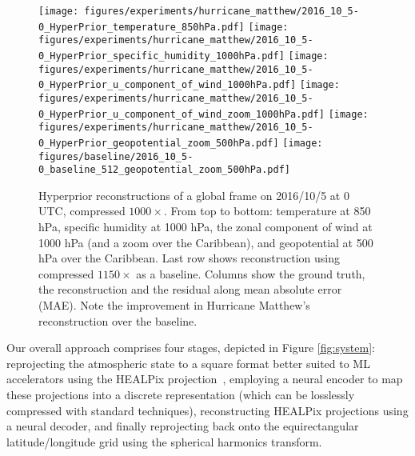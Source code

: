 \documentclass[11pt, a4paper, logo, copyright, numbering]{googledeepmind}
\begin{document}
\begin{figure}
\begin{flushright}
    \texttt{[image: figures/experiments/hurricane\_matthew/2016\_10\_5-0\_HyperPrior\_temperature\_850hPa.pdf]}
    \texttt{[image: figures/experiments/hurricane\_matthew/2016\_10\_5-0\_HyperPrior\_specific\_humidity\_1000hPa.pdf]}
    \texttt{[image: figures/experiments/hurricane\_matthew/2016\_10\_5-0\_HyperPrior\_u\_component\_of\_wind\_1000hPa.pdf]}
    \texttt{[image: figures/experiments/hurricane\_matthew/2016\_10\_5-0\_HyperPrior\_u\_component\_of\_wind\_zoom\_1000hPa.pdf]}
\texttt{[image: figures/experiments/hurricane\_matthew/2016\_10\_5-0\_HyperPrior\_geopotential\_zoom\_500hPa.pdf]}
    \texttt{[image: figures/baseline/2016\_10\_5-0\_baseline\_512\_geopotential\_zoom\_500hPa.pdf]}
\caption{Hyperprior reconstructions of a global frame on 2016/10/5 at 0 UTC, compressed $1000\times$. From top to bottom: temperature at 850 hPa, specific humidity at 1000 hPa, the zonal component of wind at 1000 hPa (and a zoom over the Caribbean), and geopotential at 500 hPa over the Caribbean. Last row shows reconstruction using \citet{huang2022compressing} compressed $1150\times$ as a baseline. Columns show the ground truth, the reconstruction and the residual along mean absolute error (MAE). Note the improvement in Hurricane Matthew's reconstruction over the baseline.}
    \label{fig:hurricane_matthew_hyperprior}
    \end{flushright}
\end{figure} 
Our overall approach comprises four stages, depicted in Figure \ref{fig:system}: reprojecting the atmospheric state to a square format better suited to ML accelerators using the HEALPix projection~\citep{gorski1999healpix}, employing a neural encoder to map these projections into a discrete representation (which can be losslessly compressed with standard techniques), reconstructing HEALPix projections using a neural decoder, and finally reprojecting back onto the equirectangular latitude/longitude grid using the spherical harmonics transform.
\end{document}
